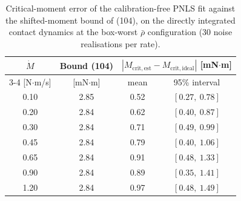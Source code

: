 \begin{table}[t]
\caption{Critical-moment error of the calibration-free PNLS fit
against the shifted-moment bound of (104), on the directly
integrated contact dynamics at the box-worst $\bar\rho$
configuration (30 noise realisations per rate).}
\label{tab:shift_validation}
\centering
\begin{tabular}{@{}cccc@{}}
\toprule
$\dot M$ & Bound (104) &
\multicolumn{2}{c}{$|M_{\mathrm{crit,est}} - M_{\mathrm{crit,ideal}}|$
 [mN$\cdot$m]}\\
\cmidrule(lr){3-4}
[N$\cdot$m/s] & [mN$\cdot$m] & mean & 95\% interval\\
\midrule
0.10 & 2.85 & 0.52 & $[0.27,\ 0.78]$\\
0.20 & 2.84 & 0.62 & $[0.40,\ 0.87]$\\
0.30 & 2.84 & 0.71 & $[0.49,\ 0.99]$\\
0.45 & 2.84 & 0.79 & $[0.40,\ 1.06]$\\
0.65 & 2.84 & 0.91 & $[0.48,\ 1.33]$\\
0.90 & 2.84 & 0.89 & $[0.35,\ 1.41]$\\
1.20 & 2.84 & 0.97 & $[0.48,\ 1.49]$\\
\bottomrule
\end{tabular}
\end{table}
